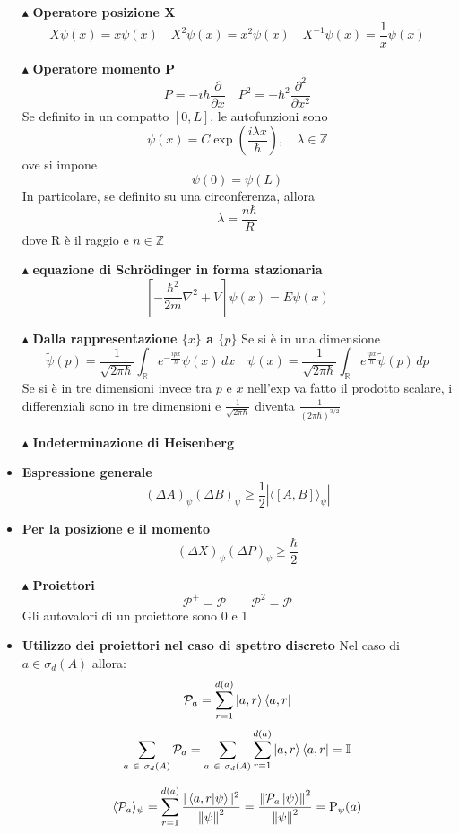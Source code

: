 \documentclass{book}
\newcommand{\g}{\textbf}
\newcommand{\e}{\begin{equation}}
\newcommand{\ex}{\end{equation} }
\renewcommand{\it}{\item[$\cdot$]}
\begin{document}
\begin{multicols}{4}
\begin{itemize}
    \item [$\blacktriangle$] \g{Operatore posizione X}
        \e{X\psi(x) = x\psi(x) \quad X^2\psi(x) = x^2\psi(x) \quad X^{-1}\psi(x) = \frac{1}{x} \psi(x)} \ex


\item [$\blacktriangle$] \g{Operatore momento P}
        \e{P = -i\hbar \frac{\partial}{\partial x} \quad P^2 = -\hbar^2 \frac{\partial^2}{\partial x^2}} \ex
    Se definito in un compatto $[0, L]$, le autofunzioni sono
        \e{\psi(x) = C \exp\left(\frac{i\lambda x}{\hbar}\right), \quad \lambda \in \mathbb{Z}} \ex
    ove si impone
        \e{\psi(0) = \psi(L)} \ex
    In particolare, se definito su una circonferenza, allora 
    \e {\lambda = \frac{n \hbar }{R}} \ex
    dove R è il raggio e $n \in \mathbb{Z}$
    \item[$\blacktriangle$] \g{equazione di Schrödinger in forma stazionaria}
        \e{\left[-\frac{\hbar^2}{2m} \nabla^2 + V\right] \psi(x) = E\psi(x)} \ex

 \item [$\blacktriangle$] \g{Dalla rappresentazione $\{x\}$ a $\{p\}$}
    Se si è in una dimensione
        \e{\tilde{\psi}(p) = \frac{1}{\sqrt{2\pi \hbar} }\int_{\mathbb{R}} e^{-\frac{ipx}{ \hbar}} \psi(x) \, dx \quad \psi(x) = \frac{1}{\sqrt{2\pi \hbar} }\int_{\mathbb{R}} e^{\frac{ipx}{\hbar}} \tilde{\psi}(p) \, dp} \ex
    Se si è in tre dimensioni invece tra $p$ e $x$ nell'exp va fatto il prodotto scalare, i differenziali sono in tre dimensioni e $\frac{1}{\sqrt{2 \pi \hbar}}$ diventa $\frac{1}{\left(2 \pi \hbar \right)^{3/2}}$
\item [$\blacktriangle$] \g{Indeterminazione di Heisenberg}
    \it \g{Espressione generale}
        \e{(\Delta A)_\psi (\Delta B)_\psi \geq \frac{1}{2}\left|{\langle [A, B] \rangle_\psi} \right|} \ex
        \it \g{Per la posizione e il momento}
        \e{(\Delta X)_{\psi}(\Delta P)_{\psi} \geq \frac{\hbar}{2}}\ex
\item [$\blacktriangle$] \g{Proiettori}
\e{\mathcal{P}^{+} = \mathcal{P} \qquad \mathcal{P}^{2} = \mathcal{P}}\ex
Gli autovalori di un proiettore sono 0 e 1 
\it \g{Utilizzo dei proiettori nel caso di spettro discreto}
Nel caso di $a \in \sigma_{d}(A)$ allora:
\e{\mathcal{P}_{a} = \sum_{r=1}^{d(a)}\ket{a,r}\bra{a,r}}\ex
\e{\sum_{a \ \in \ \sigma_{d}(A)}\mathcal{P}_{a} = \sum_{a \ \in \ \sigma_{d}(A)} \sum_{r = 1}^{d(a)}\ket{a,r}\bra{a,r} = \mathbb{I}}\ex

\e{\langle \mathcal{P}_{a} \rangle_{\psi} = \sum_{r=1}^{d(a)}\frac{|\braket{a,r}{\psi}|^{2}}{\norm{\psi}^{2}} = \frac{\norm{\mathcal{P}_{a}\ket{\psi}}^{2}}{\norm{\psi}^{2}} = \text{P}_{\psi}(a)}\ex


\end{itemize}
\end{multicols}
\end{document}
